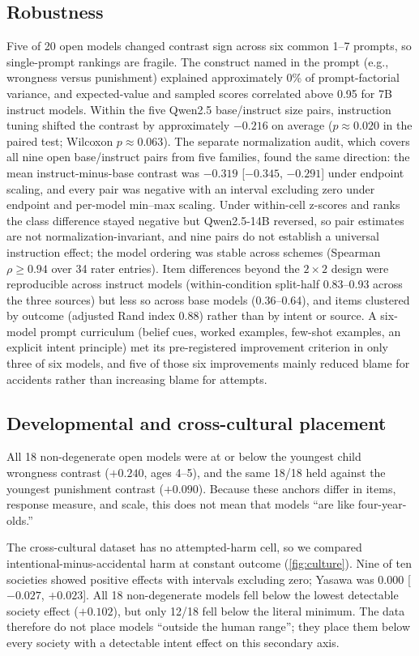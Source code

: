 \documentclass[10pt,letterpaper]{article}
\begin{document}
\subsection{Robustness}
Five of 20 open models changed contrast sign across six common 1--7 prompts, so single-prompt rankings are fragile.
The construct named in the prompt (e.g., wrongness versus punishment) explained approximately 0\% of prompt-factorial variance, and expected-value and sampled scores correlated above 0.95 for 7B instruct models.
Within the five Qwen2.5 base/instruct size pairs, instruction tuning shifted the contrast by approximately $-0.216$ on average ($p\approx0.020$ in the paired test; Wilcoxon $p\approx0.063$).
The separate normalization audit, which covers all nine open base/instruct pairs from five families, found the same direction: the mean instruct-minus-base contrast was $-0.319$ [$-0.345$, $-0.291$] under endpoint scaling, and every pair was negative with an interval excluding zero under endpoint and per-model min--max scaling.
Under within-cell z-scores and ranks the class difference stayed negative but Qwen2.5-14B reversed, so pair estimates are not normalization-invariant, and nine pairs do not establish a universal instruction effect; the model ordering was stable across schemes (Spearman $\rho\geq0.94$ over 34 rater entries).
Item differences beyond the $2\times2$ design were reproducible across instruct models (within-condition split-half 0.83--0.93 across the three sources) but less so across base models (0.36--0.64), and items clustered by outcome (adjusted Rand index 0.88) rather than by intent or source.
A six-model prompt curriculum (belief cues, worked examples, few-shot examples, an explicit intent principle) met its pre-registered improvement criterion in only three of six models, and five of those six improvements mainly reduced blame for accidents rather than increasing blame for attempts.

\subsection{Developmental and cross-cultural placement}
All 18 non-degenerate open models were at or below the youngest child wrongness contrast ($+0.240$, ages 4--5), and the same 18/18 held against the youngest punishment contrast ($+0.090$).
Because these anchors differ in items, response measure, and scale, this does not mean that models ``are like four-year-olds.''

The cross-cultural dataset has no attempted-harm cell, so we compared intentional-minus-accidental harm at constant outcome (\autoref{fig:culture}).
Nine of ten societies showed positive effects with intervals excluding zero; Yasawa was $0.000$ [$-0.027$, $+0.023$].
All 18 non-degenerate models fell below the lowest detectable society effect ($+0.102$), but only 12/18 fell below the literal minimum.
The data therefore do not place models ``outside the human range''; they place them below every society with a detectable intent effect on this secondary axis.
\end{document}
